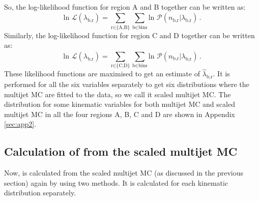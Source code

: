 So, the log-likelihood function for region A and B together can be written as: 
\begin{equation}
\text{ln }\mathcal{L}(\lambda_{\text{b,r}}) = \sum_{\text{r$\in$\{A,B\}}}^{}\sum_{\text{b$\in$bins}}^{} \text{ln }\mathcal{P}(n_{\text{b,r}}|\lambda_{\text{b,r}}) \,.
\end{equation}
Similarly, the log-likelihood function for region C and D together can be written as: 
\begin{equation}
\text{ln }\mathcal{L}(\lambda_{\text{b,r}}) = \sum_{\text{r$\in$\{C,D\}}}^{}\sum_{\text{b$\in$bins}}^{} \text{ln }\mathcal{P}(n_{\text{b,r}}|\lambda_{\text{b,r}}) \,.
\end{equation}
These likelihood functions are maximised to get an estimate of $\hat{\lambda}_{\text{b,r}}$. It is performed for all the six variables separately to get six distributions where the multijet MC are fitted to the data, so we call it scaled multijet MC. The distribution for some kinematic variables for both multijet MC and scaled multijet MC in all the four regions A, B, C and D are shown in Appendix \ref{sec:app2}.


\subsection{Calculation of \R from the scaled multijet MC}
\label{sec:abcd:furtherimprovement:rcorr}
Now, \R is calculated from the scaled multijet MC (as discussed in the previous section) again by using two methods. It is calculated for each kinematic distribution separately.

